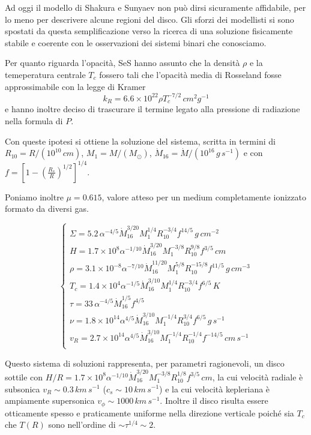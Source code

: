 \documentclass[a4paperbi]{article}
\begin{document}
Ad oggi il modello di Shakura e Sunyaev non può dirsi sicuramente affidabile, per lo meno per descrivere alcune regioni del disco. Gli sforzi dei modellisti si sono spostati da questa semplificazione verso la ricerca di una soluzione fisicamente stabile e coerente con le osservazioni dei sistemi binari che conosciamo.

Per quanto riguarda l'opacità, SeS hanno assunto che la densità $\rho$ e la temeperatura centrale $T_c$ fossero tali che l'opacità media di Rosseland fosse approssimabile con la legge di Kramer
\begin{equation}
	k_R=6.6\times10^{22}\rho T_c^{-7/2}\,cm^2g^{-1}
\end{equation}
e hanno inoltre deciso di trascurare il termine legato alla pressione di radiazione nella formula di $P$.

Con queste ipotesi si ottiene la soluzione del sistema, scritta in termini di $R_{10}=R/(10^{10}\,cm)$, $M_{1}=M/(M_\odot)$, $\dot{M}_{16}=\dot{M}/(10^{16}\,g\,s^{-1})$ e con $f=\left[1-\left(\frac{R_*}{R}\right)^{1/2}\right]^{1/4}$. 

Poniamo inoltre $\mu=0.615$, valore atteso per un medium completamente ionizzato formato da diversi gas. 

\begin{equation}
	\begin{cases}
		\Sigma=5.2\,\alpha^{-4/5}\dot{M}_{16}^{3/20}M^{1/4}_1R_{10}^{-3/4}f^{14/5}\,g\,cm^{-2}\\
		H=1.7\times10^8\alpha^{-1/10}\dot{M}^{3/20}_{16}M^{-3/8}_1R_{10}^{9/8}f^{3/5}\,cm\\
		\rho=3.1\times10^{-8}\alpha^{-7/10}\dot{M}^{11/20}_{16}M^{5/8}_1R_{10}^{-15/8}f^{11/5}\,g\,cm^{-3}\\
		T_c=1.4\times10^{4}\alpha^{-1/5}\dot{M}^{3/10}_{16}M^{1/4}_1R_{10}^{-3/4}f^{6/5}\,K\\
		\tau=33\,\alpha^{-4/5}\dot{M}^{1/5}_{16}f^{4/5}\\
		\nu=1.8\times10^{14}\alpha^{4/5}\dot{M}^{3/10}_{16}M^{-1/4}_1R_{10}^{3/4}f^{6/5}\,g\,s^{-1}\\
		v_R=2.7\times10^{14}\alpha^{4/5}\dot{M}^{3/10}_{16}M^{-1/4}_1R_{10}^{-1/4}f^{-14/5}\,cm\,s^{-1}\\
	\end{cases}
\end{equation}

	Questo sistema di soluzioni rappresenta, per parametri ragionevoli, un disco sottile con $H/R=1.7\times10^8\alpha^{-1/10}\dot{M}^{3/20}_{16}M^{-3/8}_1R_{10}^{1/8}f^{3/5}\,cm$, la cui velocità radiale è subsonica $v_R\sim 0.3\,km\,s^{-1}$ ($c_s\sim10\,km\,s^{-1}$) e la cui velocità kepleriana è ampiamente supersonica $v_\phi\sim1000\,km\,s^{-1}$. Inoltre il disco risulta essere otticamente spesso e praticamente uniforme nella direzione verticale poiché sia $T_c$ che $T(R)$ sono nell'ordine di $\sim\tau^{1/4}\sim2$.
\end{document}
